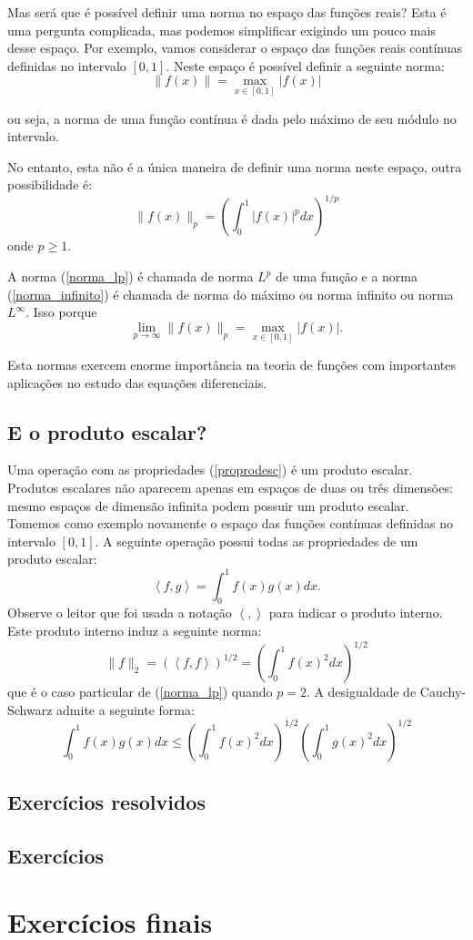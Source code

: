 Mas será que é possível definir uma norma no espaço das funções reais? Esta é uma pergunta complicada, mas podemos simplificar exigindo um pouco mais desse espaço. Por exemplo, vamos considerar o espaço das funções reais contínuas definidas no intervalo $[0,1]$. Neste espaço é possível definir a seguinte norma:
\begin{equation}\label{norma_infinito}\|f(x)\|=\max_{x\in [0,1]}|f(x)|\end{equation}

ou seja, a norma de uma função contínua é dada pelo máximo de seu módulo no intervalo.

No entanto, esta não é a única maneira de definir uma norma neste espaço, outra possibilidade é:
\begin{equation}\label{norma_lp}\|f(x)\|_{p}=\left(\int_0^1|f(x)|^pdx\right)^{1/p}\end{equation}
onde $p\geq 1$.

A norma (\ref{norma_lp}) é chamada de norma $L^p$ de uma função e a norma (\ref{norma_infinito}) é chamada de norma do máximo ou norma infinito ou norma $L^{\infty}$. Isso porque
$$\lim_{p\to\infty}\|f(x)\|_{p}=\max_{x\in [0,1]}|f(x)|.$$

Esta normas exercem enorme importância na teoria de funções com importantes aplicações no estudo das equações diferenciais.

\subsection{E o produto escalar?}
Uma operação com as propriedades (\ref{proprodesc}) é um produto escalar. Produtos escalares não aparecem apenas em espaços de duas ou três dimensões: mesmo espaços de dimensão infinita podem possuir um produto escalar. Tomemos como exemplo novamente o espaço das funções contínuas definidas no intervalo $[0,1]$. A seguinte operação possui todas as propriedades de um produto escalar:
$$\left<f,g\right>=\int_0^1f(x)g(x)dx.$$
Observe o leitor que foi usada a notação $\left<,\right>$ para indicar o produto interno. Este produto interno induz a seguinte norma:
$$\|f\|_2=\left(\left<f,f\right>\right)^{1/2}=\left(\int_0^1f(x)^2dx\right)^{1/2}$$
que é o caso particular de (\ref{norma_lp}) quando $p=2$.
 A desigualdade de Cauchy-Schwarz admite a seguinte forma:
$$\int_0^1f(x)g(x)dx \leq \left(\int_0^1f(x)^2dx\right)^{1/2} \left(\int_0^1g(x)^2dx\right)^{1/2}$$


\subsection*{Exercícios resolvidos}

\construirExeresol

\subsection*{Exercícios}

\construirExer

\section{Exercícios finais}

\construirExer
